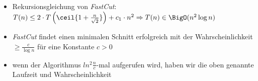 \begin{itemize}
\begin{itemize}
			\item Rekursionsgleichung von \textit{FastCut}: $T(n)\leq 2\cdot T\left(\ceil{1+\frac{n}{\sqrt{2}}}\right)+c_1\cdot n^2\\
			\Rightarrow T(n)\in \BigO(n^2\log n)$
			\item \textit{FastCut} findet einen minimalen Schnitt erfolgreich mit der Wahrscheinlichkeit $\geq \frac{c}{\log n}$ für eine Konstante $c>0$
			\item wenn der Algorithmus $ln^2 \frac{n}{c}$-mal aufgerufen wird, haben wir die oben genannte Laufzeit und Wahrscheinlichkeit
		\end{itemize}
\end{itemize}